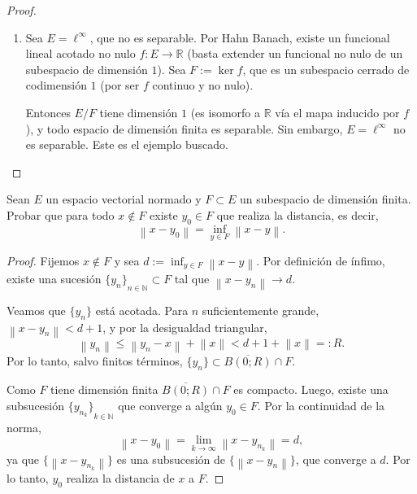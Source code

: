 \documentclass{article}
\theoremstyle{definition}
\newcommand{\R}{\mathbb{R}}
\newcommand{\N}{\mathbb{N}}
\newcommand{\norm}[1]{\left\lVert #1 \right\rVert}       %
\newcommand{\cl}[1]{\overline{#1}}                        %
\newcommand{\bola}[2]{B(#1;#2)}                           %
\newenvironment{ejercicio}[1]{\begin{trivlist}
\item[\hskip \labelsep {\bfseries Ejercicio}\hskip \labelsep {\bfseries #1.}]}{\end{trivlist}}
\begin{document}
\begin{proof}
\begin{enumerate}
        \item Sea \( E = \ell^\infty \), que no es separable. Por Hahn Banach, existe un funcional lineal acotado no nulo \( f: E \to \R \) (basta extender un funcional no nulo de un subespacio de dimensión \(1\)). Sea \( F := \ker f \), que es un subespacio cerrado de codimensión \(1\) (por ser \(f\) continuo y no nulo).

              Entonces \( E/F \) tiene dimensión \(1\) (es isomorfo a \( \R \) vía el mapa inducido por \(f\)), y todo espacio de dimensión finita es separable. Sin embargo, \( E = \ell^\infty \) no es separable. Este es el ejemplo buscado.
    \end{enumerate}
\end{proof}

\vspace{0.5cm}

\begin{ejercicio}{14}
    Sean \(E\) un espacio vectorial normado y \(F\subset E\) un subespacio de dimensión finita. Probar que para todo \(x\notin F\) existe \(y_0\in F\) que realiza la distancia, es decir,
    \[
        \norm{x-y_0}=\inf_{y\in F}\norm{x-y}.
    \]
\end{ejercicio}
\begin{proof}
    Fijemos \( x \notin F \) y sea \( d := \inf_{y\in F} \norm{x-y} \). Por definición de ínfimo, existe una sucesión \( {\{y_n\}}_{n\in\N} \subset F \) tal que \( \norm{x - y_n} \to d \).

    Veamos que \( {\{y_n\}} \) está acotada. Para \(n\) suficientemente grande, \( \norm{x-y_n} < d+1 \), y por la desigualdad triangular,
    \[
        \norm{y_n} \leq \norm{y_n - x} + \norm{x} < d + 1 + \norm{x} =: R.
    \]
    Por lo tanto, salvo finitos términos, \( {\{y_n\}} \subset \cl{\bola{0}{R}} \cap F \).

    Como \(F\) tiene dimensión finita \( \cl{\bola{0}{R}} \cap F \) es compacto. Luego, existe una subsucesión \( {\{y_{n_k}\}}_{k\in\N} \) que converge a algún \( y_0 \in F \). Por la continuidad de la norma,
    \[
        \norm{x - y_0} = \lim_{k\to\infty} \norm{x - y_{n_k}} = d,
    \]
    ya que \( {\{\norm{x-y_{n_k}}\}} \) es una subsucesión de \( {\{\norm{x-y_n}\}} \), que converge a \(d\). Por lo tanto, \( y_0 \) realiza la distancia de \(x\) a \(F\).
\end{proof}

\vspace{0.5cm}
\end{document}
